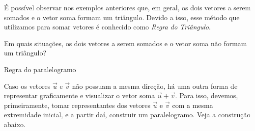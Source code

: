 É possível observar nos exemplos anteriores que, em geral, os dois vetores a serem somados e o vetor soma formam um triângulo. Devido a isso, esse método que utilizamos para somar vetores é conhecido como \textit{Regra do Triângulo}.




\begin{reflection}

Em quais situações, os dois vetores a serem somados e o vetor soma não formam um triângulo?
\end{reflection}



\begin{observationtitle}{Regra do paralelogramo}

Caso os vetores \(\vec{u}\) e \(\vec{v}\) não possuam a mesma direção, há uma outra forma de representar graficamente e visualizar o vetor soma \(\vec{u}+\vec{v}\). Para isso, devemos, primeiramente, tomar representantes dos vetores \(\vec{u}\) e \(\vec{v}\) com a mesma extremidade inicial, e a partir daí, construir um paralelogramo. Veja a construção abaixo.
\begin{figure}[H]
\centering
\begin{tikzpicture}
 

\end{tikzpicture}
\end{figure}
\end{observationtitle}
